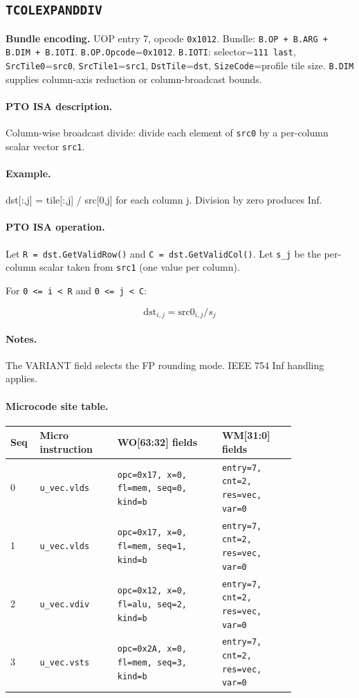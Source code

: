 \subsection{\texttt{TCOLEXPANDDIV}}
\noindent\textbf{Bundle encoding.} UOP entry 7, opcode \texttt{0x1012}. Bundle: \texttt{B.OP + B.ARG + B.DIM + B.IOTI}. \texttt{B.OP.Opcode}=\texttt{0x1012}. \texttt{B.IOTI}: selector=\texttt{111 last}, \texttt{SrcTile0}=\texttt{src0}, \texttt{SrcTile1}=\texttt{src1}, \texttt{DstTile}=\texttt{dst}, \texttt{SizeCode}=profile tile size. \texttt{B.DIM} supplies column-axis reduction or column-broadcast bounds.\par\smallskip
{\small
\paragraph{PTO ISA description.}
Column-wise broadcast divide: divide each element of \texttt{src0} by a per-column scalar vector \texttt{src1}.
\paragraph{Example.}
dst[:,j] = tile[:,j] / src[0,j] for each column j. Division by zero produces Inf.
\par\smallskip
\paragraph{PTO ISA operation.}
Let \texttt{R = dst.GetValidRow()} and \texttt{C = dst.GetValidCol()}. Let \texttt{s\_j} be the per-column scalar taken from \texttt{src1} (one value per column).

For \texttt{0 \textless{}= i \textless{} R} and \texttt{0 \textless{}= j \textless{} C}:

\[
\mathrm{dst}_{i,j} = \mathrm{src0}_{i,j} / s_j
\]
}\par\smallskip
\paragraph{Notes.}
The VARIANT field selects the FP rounding mode. IEEE 754 Inf handling applies.
\paragraph{Microcode site table.}
{\scriptsize
\begin{longtable}{@{}R{0.055\linewidth}L{0.23\linewidth}L{0.31\linewidth}L{0.22\linewidth}@{}}
\toprule
Seq & Micro instruction & WO[63:32] fields & WM[31:0] fields \\
 & \texttt{u\_vec.vlds} & \texttt{opc=0x17, x=0, fl=mem, seq=0, kind=b} & \texttt{entry=7, cnt=2, res=vec, var=0} \\
1 & \texttt{u\_vec.vlds} & \texttt{opc=0x17, x=0, fl=mem, seq=1, kind=b} & \texttt{entry=7, cnt=2, res=vec, var=0} \\
2 & \texttt{u\_vec.vdiv} & \texttt{opc=0x12, x=0, fl=alu, seq=2, kind=b} & \texttt{entry=7, cnt=2, res=vec, var=0} \\
3 & \texttt{u\_vec.vsts} & \texttt{opc=0x2A, x=0, fl=mem, seq=3, kind=b} & \texttt{entry=7, cnt=2, res=vec, var=0} \\
\bottomrule
\end{longtable}
}
